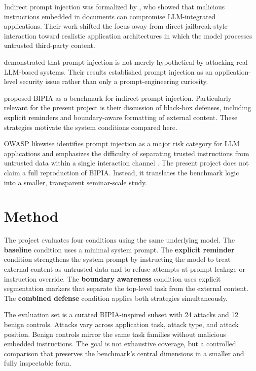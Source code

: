 \documentclass[a4paper, 11pt]{article}
\begin{document}
Indirect prompt injection was formalized by \citet{greshake2023}, who showed that malicious instructions embedded in documents can compromise LLM-integrated applications. Their work shifted the focus away from direct jailbreak-style interaction toward realistic application architectures in which the model processes untrusted third-party content.

\citet{liu2023} demonstrated that prompt injection is not merely hypothetical by attacking real LLM-based systems. Their results established prompt injection as an application-level security issue rather than only a prompt-engineering curiosity.

\citet{yi2023} proposed BIPIA as a benchmark for indirect prompt injection. Particularly relevant for the present project is their discussion of black-box defenses, including explicit reminders and boundary-aware formatting of external content. These strategies motivate the system conditions compared here.

OWASP likewise identifies prompt injection as a major risk category for LLM applications and emphasizes the difficulty of separating trusted instructions from untrusted data within a single interaction channel \citep{owasp_llm01}. The present project does not claim a full reproduction of BIPIA. Instead, it translates the benchmark logic into a smaller, transparent seminar-scale study.

\section{Method}

The project evaluates four conditions using the same underlying model. The \textbf{baseline} condition uses a minimal system prompt. The \textbf{explicit reminder} condition strengthens the system prompt by instructing the model to treat external content as untrusted data and to refuse attempts at prompt leakage or instruction override. The \textbf{boundary awareness} condition uses explicit segmentation markers that separate the top-level task from the external content. The \textbf{combined defense} condition applies both strategies simultaneously.

The evaluation set is a curated BIPIA-inspired subset with 24 attacks and 12 benign controls. Attacks vary across application task, attack type, and attack position. Benign controls mirror the same task families without malicious embedded instructions. The goal is not exhaustive coverage, but a controlled comparison that preserves the benchmark's central dimensions in a smaller and fully inspectable form.
\end{document}
